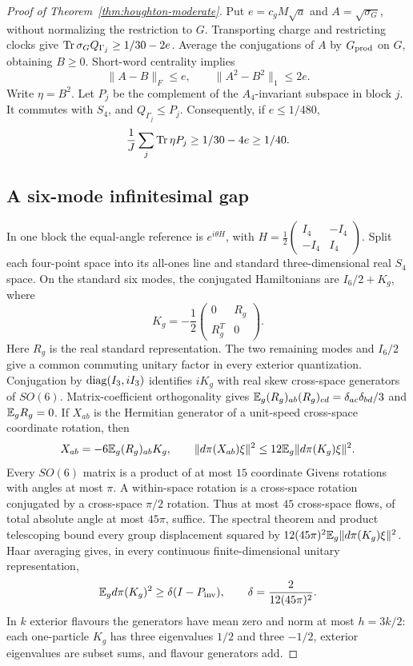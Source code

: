 \begin{proof}[Proof of Theorem~\ref{thm:houghton-moderate}]
Put $e=c_gM\sqrt a$ and $A=\sqrt{\sigma_G}$, without normalizing
the restriction to $G$. Transporting charge and restricting clocks give
$\operatorname{Tr}\sigma_GQ_{\Gamma_j}\geq1/30-2e$.
Average the conjugations of $A$ by $G_{\rm prod}$ on $G$, obtaining
$B\geq0$. Short-word centrality implies
\[
 \|A-B\|_F\leq e,\qquad \|A^2-B^2\|_1\leq2e.
\]
Write $\eta=B^2$. Let $P_j$ be the complement of the
$A_4$-invariant subspace in block $j$. It commutes with $S_4$,
and $Q_{\Gamma_j}\leq P_j$. Consequently, if $e\leq1/480$,
\begin{equation}\label{eq:moderate-block-charge}
 \frac1J\sum_j\operatorname{Tr}\eta P_j\geq1/30-4e\geq1/40.
\end{equation}

\subsection{A six-mode infinitesimal gap}

In one block the equal-angle reference is $e^{i\theta H}$, with
$H=\frac12\left(\begin{smallmatrix}I_4&-I_4\\-I_4&I_4\end{smallmatrix}\right)$.
Split each four-point space into its all-ones line and standard
three-dimensional real $S_4$ space. On the standard six modes,
the conjugated Hamiltonians are $I_6/2+K_g$, where
\[
 K_g=-\frac12
       \begin{pmatrix}0&R_g\\R_g^T&0\end{pmatrix}.
\]
Here $R_g$ is the real standard representation.
The two remaining modes and $I_6/2$ give a common commuting
unitary factor in every exterior quantization.
Conjugation by $\operatorname{diag}(I_3,iI_3)$ identifies $iK_g$ with real
skew cross-space generators of $SO(6)$.
Matrix-coefficient orthogonality gives
$\mathbb E_g(R_g)_{ab}(R_g)_{cd}=\delta_{ac}\delta_{bd}/3$
and $\mathbb E_gR_g=0$. If $X_{ab}$ is the Hermitian generator of a
unit-speed cross-space coordinate rotation, then
\[
 X_{ab}=-6\mathbb E_g(R_g)_{ab}K_g,\qquad
 \|d\pi(X_{ab})\xi\|^2
       \leq12\mathbb E_g\|d\pi(K_g)\xi\|^2.
\]
Every $SO(6)$ matrix is a product of at most $15$ coordinate
Givens rotations with angles at most $\pi$.
A within-space rotation is a cross-space rotation conjugated
by a cross-space $\pi/2$ rotation. Thus at most $45$ cross-space
flows, of total absolute angle at most $45\pi$, suffice.
The spectral theorem and product telescoping bound every group
displacement squared by
$12(45\pi)^2\mathbb E_g\|d\pi(K_g)\xi\|^2$.
Haar averaging gives, in every continuous finite-dimensional unitary representation,
\begin{equation}\label{eq:moderate-lie-gap}
 \mathbb E_g d\pi(K_g)^2\geq\delta(I-P_{\rm inv}),
 \qquad\delta=\frac2{12(45\pi)^2}.
\end{equation}
In $k$ exterior flavours the generators have mean zero and norm at most
$h=3k/2$: each one-particle $K_g$ has three eigenvalues $1/2$
and three $-1/2$, exterior eigenvalues are subset sums, and flavour
generators add.


\end{proof}
